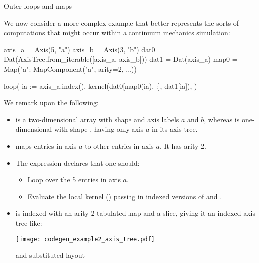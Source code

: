 \documentclass[thesis]{subfiles}
\begin{document}
\begin{example}{Outer loops and maps}

We now consider a more complex example that better represents the sorts of computations that might occur within a continuum mechanics simulation:


\begin{pyinline}
  axis_a = Axis(5, "a")
  axis_b = Axis(3, "b")
  dat0 = Dat(AxisTree.from_iterable([axis_a, axis_b]))
  dat1 = Dat(axis_a)
  map0 = Map({"a": MapComponent("a", arity=2, ...)})

  loop(
    ia := axis_a.index(),
    kernel(dat0[map0(ia), :], dat1[ia]),
  )
\end{pyinline}

We remark upon the following:

\begin{itemize}
  \item
     is a two-dimensional array with shape  and axis labels $a$ and $b$, whereas  is one-dimensional with shape , having only axis $a$ in its axis tree.

  \item
     maps entries in axis $a$ to other entries in axis $a$.
    It has arity 2.

  \item
    The  expression declares that one should:

    \begin{itemize}
      \item
        Loop over the 5 entries in axis $a$.
      \item
        Evaluate the local kernel () passing in indexed versions of  and .
    \end{itemize}

  \item
     is indexed with an arity 2 tabulated map and a slice, giving it an indexed axis tree like:

    \begin{center}
      \texttt{[image: codegen\_example2\_axis\_tree.pdf]}
    \end{center}

    \noindent
    and substituted layout


\end{itemize}
\end{example}
\end{document}
